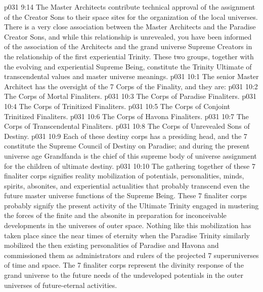 \vs p031 9:14 The Master Architects contribute technical approval of the assignment of the Creator Sons to their space sites for the organization of the local universes. There is a very close association between the Master Architects and the Paradise Creator Sons, and while this relationship is unrevealed, you have been informed of the association of the Architects and the grand universe Supreme Creators in the relationship of the first experiential Trinity. These two groups, together with the evolving and experiential Supreme Being, constitute the Trinity Ultimate of transcendental values and master universe meanings.
\vs p031 10:1 The senior Master Architect has the oversight of the 7 Corps of the Finality, and they are:
\vs p031 10:2 \bibnobreakspace The Corps of Mortal Finaliters.
\vs p031 10:3 \bibnobreakspace The Corps of Paradise Finaliters.
\vs p031 10:4 \bibnobreakspace The Corps of Trinitized Finaliters.
\vs p031 10:5 \bibnobreakspace The Corps of Conjoint Trinitized Finaliters.
\vs p031 10:6 \bibnobreakspace The Corps of Havona Finaliters.
\vs p031 10:7 \bibnobreakspace The Corps of Transcendental Finaliters.
\vs p031 10:8 \bibnobreakspace The Corps of Unrevealed Sons of Destiny.
\vs p031 10:9 Each of these destiny corps has a presiding head, and the 7 constitute the Supreme Council of Destiny on Paradise; and during the present universe age Grandfanda is the chief of this supreme body of universe assignment for the children of ultimate destiny.
\vs p031 10:10 The gathering together of these 7 finaliter corps signifies reality mobilization of potentials, personalities, minds, spirits, absonites, and experiential actualities that probably transcend even the future master universe functions of the Supreme Being. These 7 finaliter corps probably signify the present activity of the Ultimate Trinity engaged in mustering the forces of the finite and the absonite in preparation for inconceivable developments in the universes of outer space. Nothing like this mobilization has taken place since the near times of eternity when the Paradise Trinity similarly mobilized the then existing personalities of Paradise and Havona and commissioned them as administrators and rulers of the projected 7 superuniverses of time and space. The 7 finaliter corps represent the divinity response of the grand universe to the future needs of the undeveloped potentials in the outer universes of future\hyp{}eternal activities.
